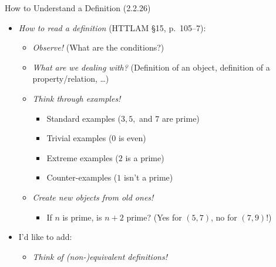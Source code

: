 \documentclass[../slides.tex]{subfiles}
\begin{document}
\begin{frame}{How to Understand a Definition (2.2.26)}

\begin{itemize}

	\item \emph{How to read a definition} (HTTLAM \S15, p.~105--7):
	
		\begin{itemize}
		
			\item \emph{Observe!} (What are the conditions?)
			
			\item \emph{What are we dealing with?} (Definition of an object, definition of a property/relation, \dots)
			
			\item \emph{Think through examples!}
			
				\begin{itemize}
				
					\item Standard examples ($3,5,$ and $7$ are prime)
					
					\item Trivial examples ($0$ is even)
					
					\item Extreme examples ($2$ is a prime)
					
					\item Counter-examples ($1$ isn't a prime)
				
				\end{itemize}
				
			\item \emph{Create new objects from old ones!}
		
			\begin{itemize}
			
				\item If $n$ is prime, is $n+2$ prime? (Yes for $(5,7)$, no for $(7,9)$!)
			
			\end{itemize}
		
		
		\end{itemize}

\item I'd like to add:
		
		\begin{itemize}
		
			\item \emph{Think of (non-)equivalent definitions!}
			

\end{itemize}
\end{itemize}
\end{frame}
\end{document}
